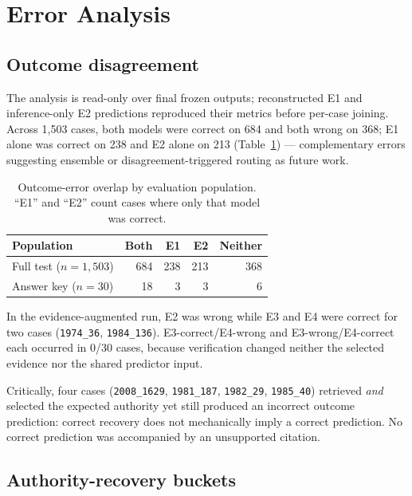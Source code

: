 \documentclass[conference]{IEEEtran}
\begin{document}
\section{Error Analysis}
\label{sec:error}

\subsection{Outcome disagreement}

The analysis is read-only over final frozen outputs; reconstructed E1
and inference-only E2 predictions reproduced their metrics
before per-case joining. Across 1{,}503 cases, both models were correct on 684
and both wrong on 368; E1 alone was correct on 238 and E2 alone on 213
(Table~\ref{tab:overlap}) --- complementary errors suggesting ensemble or
disagreement-triggered routing as future work.

\begin{table}[t]
\caption{Outcome-error overlap by evaluation population. ``E1'' and ``E2'' count cases where only that model was correct.}
\label{tab:overlap}
\centering
\footnotesize
\setlength{\tabcolsep}{4pt}
\begin{tabular}{lrrrr}
\toprule
\textbf{Population} & \textbf{Both} & \textbf{E1} & \textbf{E2} &
\textbf{Neither} \\
\midrule
Full test ($n=1{,}503$)    & 684 & 238 & 213 & 368 \\
Answer key ($n=30$)        & 18  & 3   & 3   & 6 \\
\bottomrule
\end{tabular}
\end{table}

In the evidence-augmented run, E2 was wrong while E3 and E4 were correct for two
cases (\texttt{1974\_36}, \texttt{1984\_136}). E3-correct/E4-wrong and
E3-wrong/E4-correct each occurred in 0/30 cases, because verification changed
neither the selected evidence nor the shared predictor input.

Critically, four cases (\texttt{2008\_1629}, \texttt{1981\_187},
\texttt{1982\_29}, \texttt{1985\_40}) retrieved \emph{and} selected the expected
authority yet still produced an incorrect outcome prediction: correct recovery
does not mechanically imply a correct prediction. No correct prediction was
accompanied by an unsupported citation.

\subsection{Authority-recovery buckets}
\end{document}
